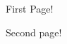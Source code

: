 \documentclass{problemset}
\begin{document}
\buildtitle

First Page!

\newpage
Second page!
\end{document}
